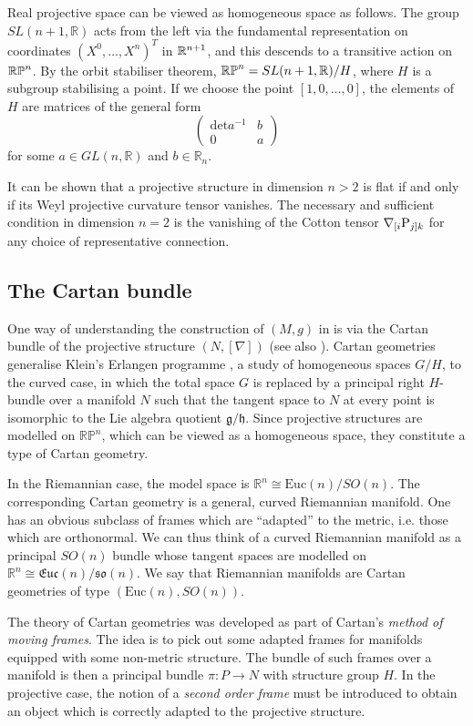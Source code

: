 Real projective space can be viewed as homogeneous space as follows. 
The group $SL(n+1,\mathbb{R})$ acts from the left via the fundamental representation on coordinates $(X^0,\dots,X^n)^T$ in $\mathbb{R}^{n+1}$, and this descends to a transitive action on $\mathbb{RP}^n$. By the orbit stabiliser theorem, $\mathbb{RP}^n=SL(n+1,\mathbb{R})/H$, where $H$ is a subgroup stabilising a point. If we choose the point $[1,0,\dots,0]$, the elements of $H$ are matrices of the general form
\[
\begin{pmatrix}\mathrm{det}a^{-1} & b\\
0 & a
\end{pmatrix}
\]
for some $a\in GL(n,\mathbb{R})$ and $b\in\mathbb{R}_{n}$. 

It can be shown that a projective structure in dimension $n>2$ is flat if and only if its Weyl projective curvature tensor vanishes. The necessary and sufficient condition in dimension $n=2$ is the vanishing of the Cotton tensor $\nabla_{[i}\mathrm{P}_{j]k}$ for any choice of representative connection.

\subsection{The Cartan bundle}

One way of understanding the construction of $(M,g)$ in \cite{DM}
is via the Cartan bundle \cite{Cartan} of the projective structure $(N,[\nabla])$ (see also \cite{KobNag}). Cartan geometries generalise Klein's Erlangen programme \cite{Klein}, a study of homogeneous spaces $G/H$, to the curved case, in which the total space $G$ is replaced by a principal right $H$-bundle over a manifold $N$ such that the tangent space to $N$ at every point is isomorphic to the Lie algebra quotient $\mathfrak{g}/\mathfrak{h}$. Since projective structures are modelled on $\mathbb{RP}^{n}$, which can be viewed as a homogeneous space, they constitute a type of Cartan geometry.

In the Riemannian case, the model space is $\mathbb{R}^{n}\cong\mathrm{Euc}(n)/SO(n)$. The corresponding Cartan geometry is a general, curved Riemannian manifold. One has an obvious subclass of frames which are ``adapted'' to the metric, i.e. those which are orthonormal. We can thus think of a curved Riemannian manifold as a principal $SO(n)$ bundle whose tangent spaces are modelled on $\mathbb{R}^{n}\cong\mathfrak{Euc}(n)/\mathfrak{so}(n)$. We say that Riemannian manifolds are Cartan geometries of type $(\mathrm{Euc}(n),SO(n))$.

The theory of Cartan geometries was developed as part of Cartan's
\textit{method of moving frames}. The idea is to pick out some adapted frames for manifolds equipped with some non-metric structure. The bundle of such frames over a manifold is then a principal bundle $\pi:P\rightarrow N$ with structure group $H$. In the projective case, the notion of a \textit{second order frame} must be introduced to obtain an object which is correctly adapted to the projective structure.

